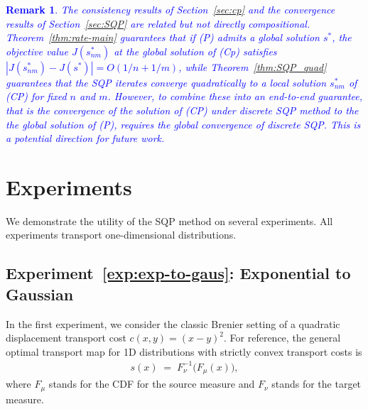 \documentclass[12pt,leqno]{amsart}
\newtheorem{remark}{Remark}
\newcounter{experiment}
\newcommand{\zihe}[1]{\textcolor{blue}{#1}}
\begin{document}
\zihe{
\begin{remark}
The consistency results of Section~\ref{sec:cp} and the convergence results of 
Section~\ref{sec:SQP} are related but not directly compositional. 
Theorem~\ref{thm:rate-main} guarantees that if (P) admits a global solution $s^*$, the objective value $J(s^*_{nm})$ at the global solution of (Cp) satisfies $|J(s^*_{nm}) - J(s^*)| = O(1/n + 1/m)$, while 
Theorem~\ref{thm:SQP_quad} guarantees that the SQP iterates converge quadratically 
to a local solution $s^*_{nm}$ of (CP) for fixed $n$ and $m$. However, to combine
these into an end-to-end guarantee, that is the convergence of the solution of (CP) under discrete SQP method to the the global solution of (P), requires the global convergence of discrete SQP. This is a potential direction for future work.
\end{remark}}

\section{Experiments}\label{sec:experiments}
We demonstrate the utility of the SQP method on several experiments. All experiments transport one-dimensional distributions. 

\label{exp:exp-to-gaus}
\subsection*{Experiment~\ref{exp:exp-to-gaus}: Exponential to Gaussian}
In the first experiment, we consider the classic Brenier setting of a quadratic displacement transport cost $c(x, y) = (x - y) ^2$. For reference, the general optimal transport map for 1D distributions with strictly convex transport costs is
\begin{align*}
s(x) \;=\; F_{\nu}^{-1}\!\big(F_{\mu}(x)\big), 
\end{align*}
where $F_{\mu}$ stands for the CDF for the source measure and $F_{\nu}$ stands for the target measure.
\end{document}
